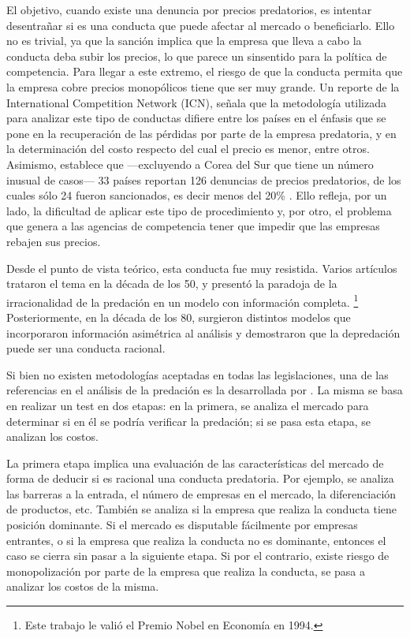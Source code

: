\documentclass[
  12pt,
  spanish,
]{book}
\begin{document}
El objetivo, cuando existe una denuncia por precios predatorios, es intentar desentrañar si es una conducta que puede afectar al mercado o beneficiarlo. Ello no es trivial, ya que la sanción implica que la empresa que lleva a cabo la conducta deba subir los precios, lo que parece un sinsentido para la política de competencia. Para llegar a este extremo, el riesgo de que la conducta permita que la empresa cobre precios monopólicos tiene que ser muy grande. Un reporte de la International Competition Network (ICN), señala que la metodología utilizada para analizar este tipo de conductas difiere entre los países en el énfasis que se pone en la recuperación de las pérdidas por parte de la empresa predatoria, y en la determinación del costo respecto del cual el precio es menor, entre otros. Asimismo, establece que ---excluyendo a Corea del Sur que tiene un número inusual de casos--- 33 países reportan 126 denuncias de precios predatorios, de los cuales sólo 24 fueron sancionados, es decir menos del 20\% \citep{ICN2008}. Ello refleja, por un lado, la dificultad de aplicar este tipo de procedimiento y, por otro, el problema que genera a las agencias de competencia tener que impedir que las empresas rebajen sus precios.

Desde el punto de vista teórico, esta conducta fue muy resistida. Varios artículos trataron el tema en la década de los 50, y \citet{Selten1978} presentó la paradoja de la irracionalidad de la predación en un modelo con información completa.
\footnote{Este trabajo le valió el Premio Nobel en Economía en 1994.}
Posteriormente, en la década de los 80, surgieron distintos modelos que incorporaron información asimétrica al análisis y demostraron que la depredación puede ser una conducta racional.

Si bien no existen metodologías aceptadas en todas las legislaciones, una de las referencias en el análisis de la predación es la desarrollada por \citet{Joskow1979}. La misma se basa en realizar un test en dos etapas: en la primera, se analiza el mercado para determinar si en él se podría verificar la predación; si se pasa esta etapa, se analizan los costos.

La primera etapa implica una evaluación de las características del mercado de forma de deducir si es racional una conducta predatoria. Por ejemplo, se analiza las barreras a la entrada, el número de empresas en el mercado, la diferenciación de productos, etc. También se analiza si la empresa que realiza la conducta tiene posición dominante. Si el mercado es disputable fácilmente por empresas entrantes, o si la empresa que realiza la conducta no es dominante, entonces el caso se cierra sin pasar a la siguiente etapa. Si por el contrario, existe riesgo de monopolización por parte de la empresa que realiza la conducta, se pasa a analizar los costos de la misma.
\end{document}
